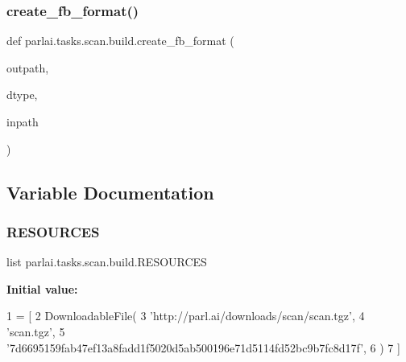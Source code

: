 \mbox{\label{namespaceparlai_1_1tasks_1_1scan_1_1build_acd920598e2932f5f8db51dcf6e25a00c}} 
\subsubsection{\texorpdfstring{create\+\_\+fb\+\_\+format()}{create\_fb\_format()}}
{\footnotesize\ttfamily def parlai.\+tasks.\+scan.\+build.\+create\+\_\+fb\+\_\+format (\begin{DoxyParamCaption}\item[{}]{outpath,  }\item[{}]{dtype,  }\item[{}]{inpath }\end{DoxyParamCaption})}



\subsection{Variable Documentation}
\mbox{\label{namespaceparlai_1_1tasks_1_1scan_1_1build_a2ffa186ae863ea2f01869a3afb9ce4e0}} 
\subsubsection{\texorpdfstring{R\+E\+S\+O\+U\+R\+C\+ES}{RESOURCES}}
{\footnotesize\ttfamily list parlai.\+tasks.\+scan.\+build.\+R\+E\+S\+O\+U\+R\+C\+ES}

{\bfseries Initial value\+:}
\begin{DoxyCode}
1 =  [
2     DownloadableFile(
3         \textcolor{stringliteral}{'http://parl.ai/downloads/scan/scan.tgz'},
4         \textcolor{stringliteral}{'scan.tgz'},
5         \textcolor{stringliteral}{'7d6695159fab47ef13a8fadd1f5020d5ab500196e71d5114fd52bc9b7fc8d17f'},
6     )
7 ]
\end{DoxyCode}
